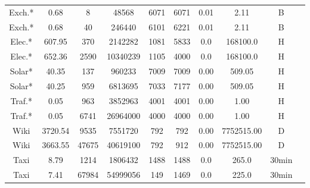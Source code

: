 \begin{table}[htb]
\begin{tabular}{c | c c c c c c c c c}
    \hline
    Exch.*            & 0.68           & 8                & 48568           & 6071               & 6071              & 0.01          & 2.11          & B               \\
    Exch.*            & 0.68           & 40               & 246440          & 6101               & 6221              & 0.01          & 2.11          & B               \\
    \hline
    Elec.*            & 607.95         & 370              & 2142282         & 1081               & 5833              & 0.0           & 168100.0      & H               \\
    Elec.*            & 652.36         & 2590             & 10340239        & 1105               & 4000              & 0.0           & 168100.0      & H               \\
    \hline
    Solar*            & 40.35          & 137              & 960233          & 7009               & 7009              & 0.00          & 509.05        & H               \\
    Solar*            & 40.25          & 959              & 6813695         & 7033               & 7177              & 0.00          & 509.05        & H               \\
    \hline
    Traf.*            & 0.05           & 963              & 3852963         & 4001               & 4001              & 0.00          & 1.00          & H               \\
    Traf.*            & 0.05           & 6741             & 26964000        & 4000               & 4000              & 0.00          & 1.00          & H               \\
    \hline
    Wiki              & 3720.54        & 9535             & 7551720         & 792                & 792               & 0.00          & 7752515.00    & D               \\
    Wiki              & 3663.55        & 47675            & 40619100        & 792                & 912               & 0.00          & 7752515.00    & D               \\
    \hline
    Taxi              & 8.79           & 1214             & 1806432         & 1488               & 1488              & 0.0           & 265.0         & 30min           \\
    Taxi              & 7.41           & 67984            & 54999056        & 149                & 1469              & 0.0           & 225.0         & 30min           \\

\end{tabular}
\end{table}
